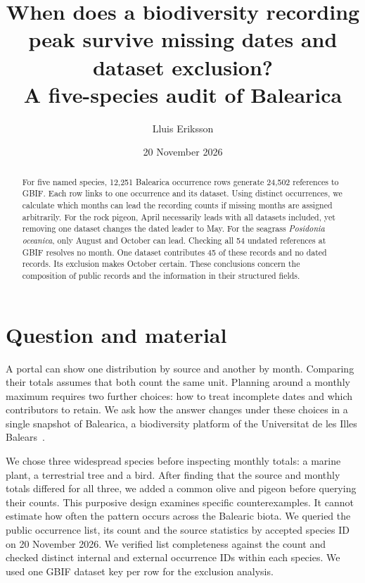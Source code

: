 \documentclass[11pt]{article}
\title{When does a biodiversity recording peak survive missing dates and dataset exclusion?\\[3pt]\large A five-species audit of Balearica}
\author{Lluis Eriksson}
\date{20 November 2026}
\begin{document}
\maketitle
\begin{abstract}
For five named species, 12,251 Balearica occurrence rows generate 24,502 references to GBIF. Each row links to one occurrence and its dataset. Using distinct occurrences, we calculate which months can lead the recording counts if missing months are assigned arbitrarily. For the rock pigeon, April necessarily leads with all datasets included, yet removing one dataset changes the dated leader to May. For the seagrass \emph{Posidonia oceanica}, only August and October can lead. Checking all 54 undated references at GBIF resolves no month. One dataset contributes 45 of these records and no dated records. Its exclusion makes October certain. These conclusions concern the composition of public records and the information in their structured fields.
\end{abstract}
\section{Question and material}
A portal can show one distribution by source and another by month. Comparing their totals assumes that both count the same unit. Planning around a monthly maximum requires two further choices: how to treat incomplete dates and which contributors to retain. We ask how the answer changes under these choices in a single snapshot of Balearica, a biodiversity platform of the Universitat de les Illes Balears~\cite{bal,method}.

We chose three widespread species before inspecting monthly totals: a marine plant, a terrestrial tree and a bird. After finding that the source and monthly totals differed for all three, we added a common olive and pigeon before querying their counts. This purposive design examines specific counterexamples. It cannot estimate how often the pattern occurs across the Balearic biota. We queried the public occurrence list, its count and the source statistics by accepted species ID on 20 November 2026. We verified list completeness against the count and checked distinct internal and external occurrence IDs within each species. We used one GBIF dataset key per row for the exclusion analysis.
\end{document}
